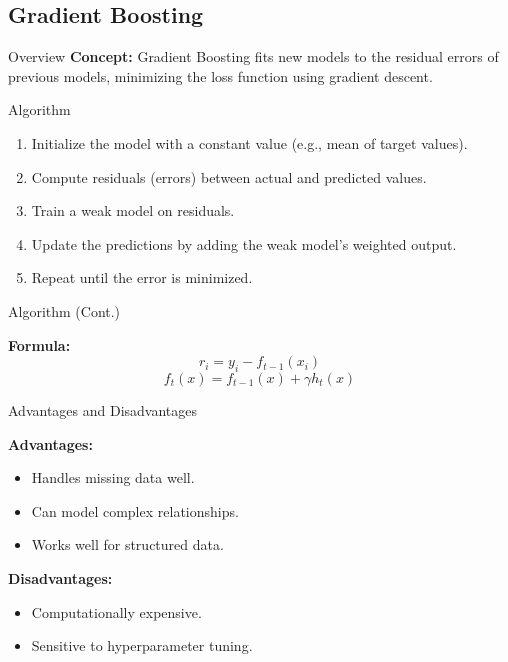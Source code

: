 \documentclass[serif, aspectratio=169]{beamer}
\begin{document}
\subsection{Gradient Boosting}
\begin{frame}{Overview}
\textbf{Concept:} Gradient Boosting fits new models to the residual errors of previous models, minimizing the loss function using gradient descent.
\end{frame}
\begin{frame}{Algorithm}
    
\begin{enumerate}
    \item Initialize the model with a constant value (e.g., mean of target values).
    \item Compute residuals (errors) between actual and predicted values.
    \item Train a weak model on residuals.
    \item Update the predictions by adding the weak model’s weighted output.
    \item Repeat until the error is minimized.
\end{enumerate}
\end{frame}

\begin{frame}{Algorithm (Cont.)}
    
\textbf{Formula:}
\begin{equation}
    r_i = y_i - f_{t-1}(x_i)
\end{equation}
\begin{equation}
    f_t(x) = f_{t-1}(x) + \gamma h_t(x)
\end{equation}
\end{frame}

\begin{frame}{Advantages and Disadvantages}
    
\textbf{Advantages:}
\begin{itemize}
    \item Handles missing data well.
    \item Can model complex relationships.
    \item Works well for structured data.
\end{itemize}

\textbf{Disadvantages:}
\begin{itemize}
    \item Computationally expensive.
    \item Sensitive to hyperparameter tuning.
\end{itemize}
\end{frame}
\end{document}

